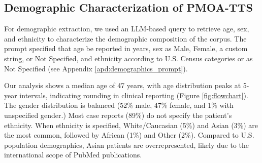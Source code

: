 
% 
\vspace{-2mm}
\subsection{Demographic Characterization of PMOA-TTS}
\label{sec:demographics}
\vspace{-2mm}


For demographic extraction, we used an LLM-based query to retrieve age, sex, and ethnicity to characterize the demographic composition of the corpus. The prompt specified that age be reported in years, sex as Male, Female, a custom string, or Not Specified, and ethnicity according to U.S. Census categories or as Not Specified (see Appendix \ref{apd:demographics_prompt}).

Our analysis shows a median age of 47 years, with age distribution peaks at 5-year intervals, indicating rounding in clinical reporting (Figure \ref{fig:flowchart}). The gender distribution is balanced (52\% male, 47\% female, and 1\% with unspecified gender.) Most case reports (89\%) do not specify the patient's ethnicity. When ethnicity is specified, White/Caucasian (5\%) and Asian (3\%) are the most common, followed by African (1\%) and Other (2\%). Compared to U.S. population demographics, Asian patients are overrepresented, likely due to the international scope of PubMed publications.


